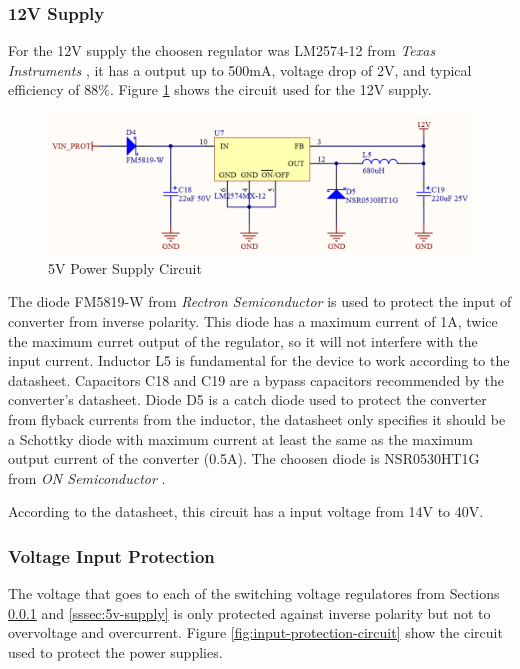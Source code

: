 		\subsubsection{12V Supply}\label{sssec:12v-supply}
			For the 12V supply the choosen regulator was LM2574-12 from \textit{Texas Instruments} \cite{lm2574-12-datasheet}, it has a output up to 500mA, voltage drop of 2V, and typical efficiency of $88\%$. Figure \ref{fig:lm2574-12-circuit} shows the circuit used for the 12V supply.

			\begin{figure}[htbp]
				\centering
					\includegraphics[scale=0.4]{figuras/fig-lm2574-12-circuit.png}
				\caption{5V Power Supply Circuit\cite{lm2574-12-circuit}}
				\label{fig:lm2574-12-circuit}
			\end{figure}	

			The diode FM5819-W from \textit{Rectron Semiconductor} \cite{fm5819-w-datasheet} is used to protect the input of converter from inverse polarity. This diode has a maximum current of 1A, twice the maximum curret output of the regulator, so it will not interfere with the input current. Inductor L5 is fundamental for the device to work according to the datasheet. Capacitors C18 and C19 are a bypass capacitors recommended by the converter's datasheet. Diode D5 is a catch diode used to protect the converter from flyback currents from the inductor, the datasheet only specifies it should be a Schottky diode with maximum current at least the same as the maximum output current of the converter (0.5A). The choosen diode is NSR0530HT1G from \textit{ON Semiconductor} \cite{NSR0530HT1G-datasheet}.
			\par
			According to the datasheet, this circuit has a input voltage from 14V to 40V.	

		\subsubsection{Voltage Input Protection}\label{sssec:voltage-input-protection}

			The voltage that goes to each of the switching voltage regulatores from Sections \ref{sssec:12v-supply} and \ref{sssec:5v-supply} is only protected against inverse polarity but not to overvoltage and overcurrent. Figure \ref{fig:input-protection-circuit} show the circuit used to protect the power supplies.

